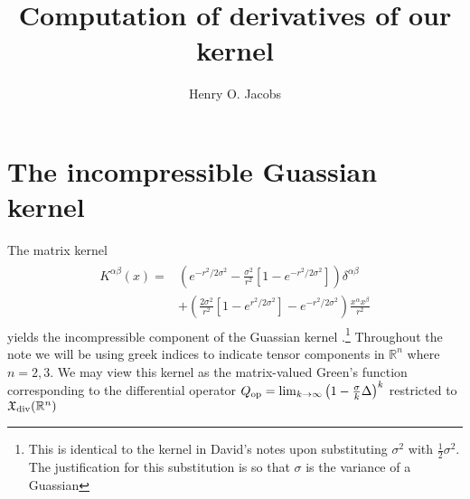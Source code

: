 \documentclass[12pt]{amsart}
\title{Computation of derivatives of our kernel}
\author{Henry O. Jacobs}
\begin{document}
\maketitle
\section{The incompressible Guassian kernel}
The matrix kernel
\begin{align}
\begin{split}  K^{\alpha \beta}(x) =& \left( e^{-r^2/2\sigma^2} - \frac{\sigma^2}{r^2}
    \left[ 1 - e^{-r^2/ 2\sigma^2} \right] \right) \delta^{\alpha \beta} \\
  &+ \left( \frac{2 \sigma^2}{r^2} \left[ 1 - e^{r^2 / 2 \sigma^2} \right] - e^{-r^2 / 2 \sigma^2 } \right) \frac{x^\alpha x^\beta }{r^2}
  \end{split} \label{eq:kernel}
\end{align}
yields the incompressible component of the Guassian kernel
\cite{MicheliGlaunes2013}.\footnote{This is identical to the kernel in David's notes upon substituting $\sigma^2$ with $\frac{1}{2} \sigma^2$.
The justification for this substitution is so that $\sigma$ is the variance of a Guassian}
Throughout the note we will be using greek indices to indicate tensor
components in $\mathbb{R}^n$ where $n = 2,3$.
We may view this kernel as the matrix-valued Green's function
corresponding to the differential operator $Q_{\rm op} = \lim_{k \to
  \infty} \left( 1 - \frac{\sigma}{k}\Delta \right)^k$ restricted to
  $\mathfrak{X}_{\rm div}( \mathbb{R}^n)$
\end{document}

